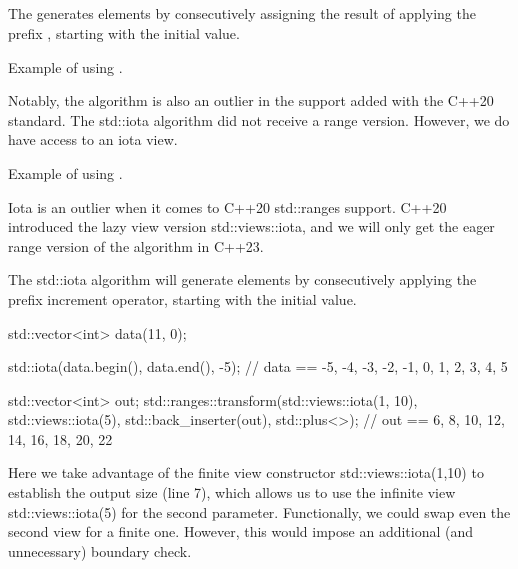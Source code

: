\subsection{\texorpdfstring{}{\texttt{std::iota}}}

The  generates elements by consecutively assigning the result of applying the prefix , starting with the initial value.


\begin{box-note}
\footnotesize Example of using .
\tcblower
{}
\end{box-note}

Notably, the  algorithm is also an outlier in the support added with the C++20 standard. The std::iota algorithm did not receive a range version. However, we do have access to an iota view.

\begin{box-note}
\footnotesize Example of using .
\tcblower
{}
\end{box-note}


Iota is an outlier when it comes to C++20 std::ranges support. C++20 introduced the lazy view version std::views::iota, and we will only get the eager range version of the algorithm in C++23.



The std::iota algorithm will generate elements by consecutively applying the prefix increment operator, starting with the initial value.

\begin{box-note}
\begin{cppcode}
std::vector<int> data(11, 0);

std::iota(data.begin(), data.end(), -5); 
// data == { -5, -4, -3, -2, -1, 0, 1, 2, 3, 4, 5 }

std::vector<int> out;
std::ranges::transform(std::views::iota(1, 10), std::views::iota(5), 
                       std::back_inserter(out), std::plus<>{});
// out == { 6, 8, 10, 12, 14, 16, 18, 20, 22 }
\end{cppcode}
\end{box-note}

Here we take advantage of the finite view constructor std::views::iota(1,10) to establish the output size (line 7), which allows us to use the infinite view std::views::iota(5) for the second parameter. Functionally, we could swap even the second view for a finite one. However, this would impose an additional (and unnecessary) boundary check.
